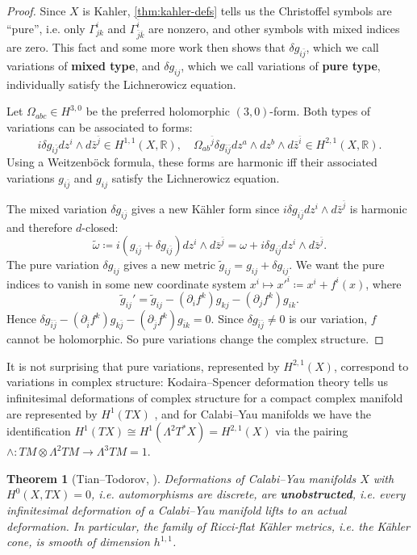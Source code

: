 \documentclass{report}
\theoremstyle{plain}
\newtheorem{theorem}{Theorem}[section]
\theoremstyle{definition}
\theoremstyle{remark}
\newcommand{\di}{\partial}
\newcommand{\bR}{\mathbb{R}}
\newcommand{\bz}{\bar{z}}
\begin{document}
\begin{proof}
  Since $X$ is Kahler, \ref{thm:kahler-defs} tells us the Christoffel
  symbols are ``pure'', i.e. only $\Gamma^i_{jk}$ and
  $\Gamma^{\bar{i}}_{\bar{j}\bar{k}}$ are nonzero, and other symbols
  with mixed indices are zero. This fact and some more work then shows
  that $\delta g_{i\bar{j}}$, which we call variations of {\bf mixed
    type}, and $\delta g_{ij}$, which we call variations of {\bf pure
    type}, individually satisfy the Lichnerowicz equation.

  Let $\Omega_{abc} \in H^{3,0}$ be the preferred holomorphic
  $(3,0)$-form. Both types of variations can be associated to forms:
  \[ i\delta g_{i\bar{j}} dz^i \wedge d\bz^{\bar{j}} \in H^{1,1}(X, \bR), \quad \Omega_{ab}{}^{\bar{j}} \delta g_{\bar{i}\bar{j}} dz^a \wedge dz^b \wedge d\bz^{\bar{i}} \in H^{2,1}(X, \bR). \]
  Using a Weitzenb\"ock formula, these forms are harmonic iff their
  associated variations $g_{i\bar{j}}$ and $g_{ij}$ satisfy the
  Lichnerowicz equation.

  The mixed variation $\delta g_{i\bar{j}}$ gives a new K\"ahler form
  since $i \delta g_{i\bar{j}} dz^i \wedge d\bz^{\bar{j}}$ is harmonic
  and therefore $d$-closed:
  \[ \tilde{\omega} \coloneqq i(g_{i\bar{j}} + \delta g_{i\bar{j}}) dz^i \wedge d\bz^{\bar{j}} = \omega + i\delta g_{i\bar{j}} dz^i \wedge d\bz^{\bar{j}}. \]
  The pure variation $\delta g_{ij}$ gives a new metric
  $\tilde{g}_{ij} = g_{ij} + \delta g_{ij}$. We want the pure indices
  to vanish in some new coordinate system $x^i \mapsto x'^i \coloneqq
  x^i + f^i(x)$, where
  \[ \tilde{g}_{ij}' = \tilde{g}_{ij} - (\di_i f^k) g_{kj} - (\di_j f^k) g_{ik}. \]
  Hence $\delta g_{\bar{i}\bar{j}} - (\di_{\bar{i}} f^k) g_{k\bar{j}}
  - (\di_{\bar{j}} f^k)g_{\bar{i}k} = 0$. Since $\delta
  g_{\bar{i}\bar{j}} \neq 0$ is our variation, $f$ cannot be
  holomorphic. So pure variations change the complex structure.
\end{proof}

It is not surprising that pure variations, represented by
$H^{2,1}(X)$, correspond to variations in complex structure:
Kodaira--Spencer deformation theory tells us infinitesimal
deformations of complex structure for a compact complex manifold are
represented by $H^1(TX)$ \cite[Section 9.1.2]{Voisin2002}, and for
Calabi--Yau manifolds we have the identification $H^1(TX) \cong
H^1(\Lambda^2 T^*X) = H^{2,1}(X)$ via the pairing $\wedge\colon TM
\otimes \Lambda^2 TM \to \Lambda^3TM = 1$.

\begin{theorem}[Tian--Todorov, \cite{Tian1987}]
  Deformations of Calabi--Yau manifolds $X$ with $H^0(X, TX) = 0$,
  i.e. automorphisms are discrete, are {\bf unobstructed}, i.e. every
  infinitesimal deformation of a Calabi--Yau manifold lifts to an
  actual deformation. In particular, the family of Ricci-flat K\"ahler
  metrics, i.e. the K\"ahler cone, is smooth of dimension $h^{1,1}$.
\end{theorem}
\end{document}
